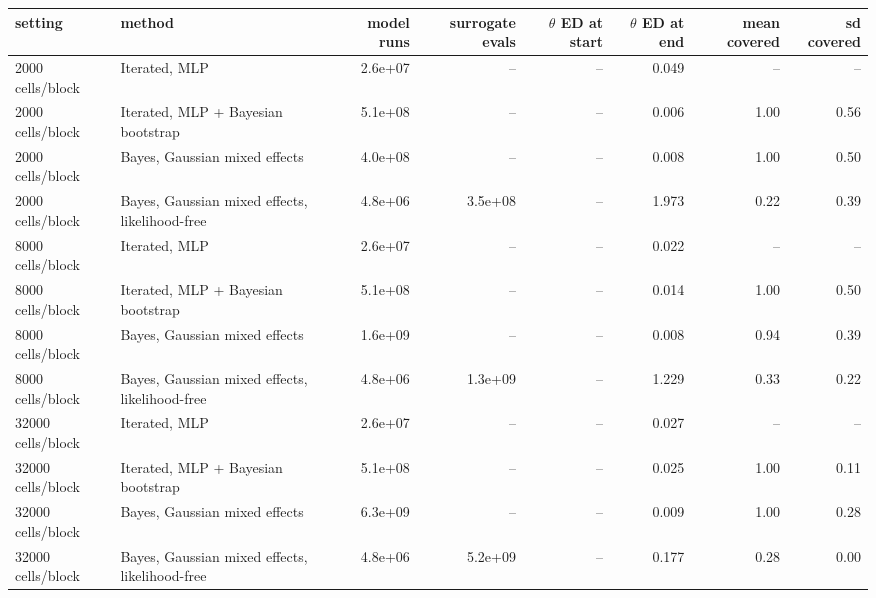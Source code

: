 \begin{tabular}{llrrrrrr}
\toprule
setting & method & model runs & surrogate evals & $\theta$ ED at start & $\theta$ ED at end & mean covered & sd covered \\
\midrule
2000 cells/block & Iterated, MLP & 2.6e+07 & -- & -- & 0.049 & -- & -- \\
2000 cells/block & Iterated, MLP + Bayesian bootstrap & 5.1e+08 & -- & -- & 0.006 & 1.00 & 0.56 \\
2000 cells/block & Bayes, Gaussian mixed effects & 4.0e+08 & -- & -- & 0.008 & 1.00 & 0.50 \\
2000 cells/block & Bayes, Gaussian mixed effects, likelihood-free & 4.8e+06 & 3.5e+08 & -- & 1.973 & 0.22 & 0.39 \\
8000 cells/block & Iterated, MLP & 2.6e+07 & -- & -- & 0.022 & -- & -- \\
8000 cells/block & Iterated, MLP + Bayesian bootstrap & 5.1e+08 & -- & -- & 0.014 & 1.00 & 0.50 \\
8000 cells/block & Bayes, Gaussian mixed effects & 1.6e+09 & -- & -- & 0.008 & 0.94 & 0.39 \\
8000 cells/block & Bayes, Gaussian mixed effects, likelihood-free & 4.8e+06 & 1.3e+09 & -- & 1.229 & 0.33 & 0.22 \\
32000 cells/block & Iterated, MLP & 2.6e+07 & -- & -- & 0.027 & -- & -- \\
32000 cells/block & Iterated, MLP + Bayesian bootstrap & 5.1e+08 & -- & -- & 0.025 & 1.00 & 0.11 \\
32000 cells/block & Bayes, Gaussian mixed effects & 6.3e+09 & -- & -- & 0.009 & 1.00 & 0.28 \\
32000 cells/block & Bayes, Gaussian mixed effects, likelihood-free & 4.8e+06 & 5.2e+09 & -- & 0.177 & 0.28 & 0.00 \\
\bottomrule
\end{tabular}
